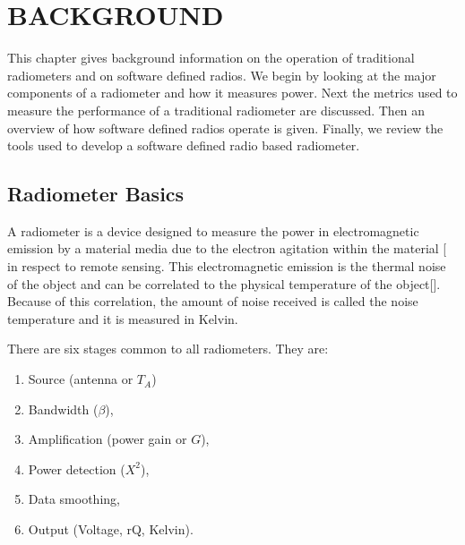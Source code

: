 
\chapter{BACKGROUND}\label{ch:background}
This chapter gives background information on the operation of  traditional radiometers and on software defined radios.  We begin by looking at the major components of a radiometer and how it measures power.  Next the metrics used to measure the performance of a traditional radiometer are discussed.  Then an overview of how software defined radios operate is given.  Finally, we review the tools used to develop a software defined radio based radiometer.  

\section{Radiometer Basics}\label{rad_basics}
A radiometer is a device designed to measure the power in electromagnetic emission by a material media due to the electron agitation within the material [\cite{ulaby} in respect to remote sensing.  This electromagnetic emission is the thermal noise of the object and can be correlated to the physical temperature of the object[\cite{Nyquist1928thermal}].  Because of this correlation, the amount of noise received is called the noise temperature and it is measured in Kelvin. 

There are six stages common to all radiometers.  They are:

\begin{enumerate}
\item Source (antenna or $T_{A}$)
\item Bandwidth ($\beta$),
\item Amplification (power gain or $G$),
\item Power detection ($X^{2}$),
\item Data smoothing,
\item Output (Voltage, rQ, Kelvin).
\end{enumerate}

